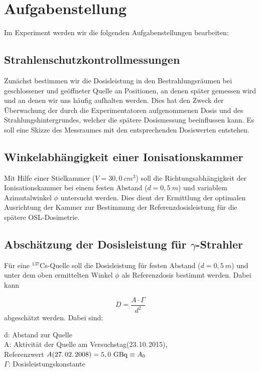 \section{Aufgabenstellung}
Im Experiment werden wir die folgenden Aufgabenstellungen bearbeiten:
\subsection{Strahlenschutzkontrollmessungen}
Zunächst bestimmen wir die Dosisleistung in den Bestrahlungsräumen bei geschlossener und geöffneter Quelle an Positionen, an denen später gemessen wird und an denen wir uns häufig aufhalten werden. Dies hat den Zweck der Überwachung der durch die Experimentatoren aufgenommenen Dosis und des Strahlungshintergrundes, welcher die spätere Dosismessung beeinflussen kann. Es soll eine Skizze des Messraumes mit den entsprechenden Dosiswerten entstehen.

\subsection{Winkelabhängigkeit einer Ionisationskammer}
Mit Hilfe einer Stielkammer ($V = 30,0\ \unit{cm^3}$) soll die Richtungsabhängigkeit der Ionisationskammer bei einem festen Abstand ($d=0,5\ \unit{m}$) und variablem Azimutalwinkel $\phi$ untersucht werden.
Dies dient der Ermittlung der optimalen Ausrichtung der Kammer zur Bestimmung der Referenzdosisleistung für die spätere OSL-Dosimetrie.

\subsection{Abschätzung der Dosisleistung für $\gamma$-Strahler}
Für eine $^{137}$Cs-Quelle soll die Dosisleistung für festen Abstand ($d=0,5\ \unit{m}$) und unter dem oben ermittelten Winkel $\phi$ als Referenzdosis bestimmt werden. Dabei kann

\begin{equation} \label{eq:dosisleistung}
	\dot{D}=\frac{A \cdot \Gamma}{d^2}
\end{equation}
abgeschätzt werden. Dabei sind:
\begin{center}
	\begin{minipage}{.9\textwidth}
		d: Abstand zur Quelle\\
		A: Aktivität der Quelle am Versuchstag(23$\ldotp$10$\ldotp$2015), \\
		Referenzwert $A(27\ldotp02\ldotp2008) = 5,0\ \unit{GBq} \equiv A_0$\\
		$\Gamma$: Dosisleistungskonstante
	
	\end{minipage}
\end{center}

